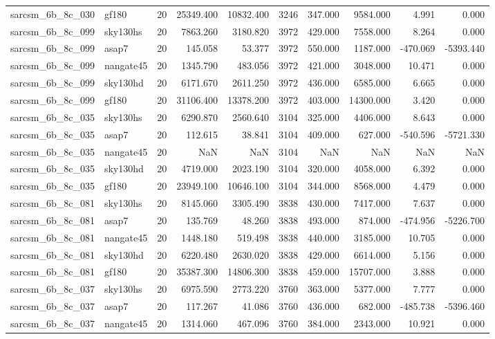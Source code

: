 \begin{longtable}{llrrrrrrrr}
sarcsm\_6b\_8c\_030 & gf180 & 20 & 25349.400 & 10832.400 & 3246 & 347.000 & 9584.000 & 4.991 & 0.000 \\
sarcsm\_6b\_8c\_099 & sky130hs & 20 & 7863.260 & 3180.820 & 3972 & 429.000 & 7558.000 & 8.264 & 0.000 \\
sarcsm\_6b\_8c\_099 & asap7 & 20 & 145.058 & 53.377 & 3972 & 550.000 & 1187.000 & -470.069 & -5393.440 \\
sarcsm\_6b\_8c\_099 & nangate45 & 20 & 1345.790 & 483.056 & 3972 & 421.000 & 3048.000 & 10.471 & 0.000 \\
sarcsm\_6b\_8c\_099 & sky130hd & 20 & 6171.670 & 2611.250 & 3972 & 436.000 & 6585.000 & 6.665 & 0.000 \\
sarcsm\_6b\_8c\_099 & gf180 & 20 & 31106.400 & 13378.200 & 3972 & 403.000 & 14300.000 & 3.420 & 0.000 \\
sarcsm\_6b\_8c\_035 & sky130hs & 20 & 6290.870 & 2560.640 & 3104 & 325.000 & 4406.000 & 8.643 & 0.000 \\
sarcsm\_6b\_8c\_035 & asap7 & 20 & 112.615 & 38.841 & 3104 & 409.000 & 627.000 & -540.596 & -5721.330 \\
sarcsm\_6b\_8c\_035 & nangate45 & 20 & NaN & NaN & 3104 & NaN & NaN & NaN & NaN \\
sarcsm\_6b\_8c\_035 & sky130hd & 20 & 4719.000 & 2023.190 & 3104 & 320.000 & 4058.000 & 6.392 & 0.000 \\
sarcsm\_6b\_8c\_035 & gf180 & 20 & 23949.100 & 10646.100 & 3104 & 344.000 & 8568.000 & 4.479 & 0.000 \\
sarcsm\_6b\_8c\_081 & sky130hs & 20 & 8145.060 & 3305.490 & 3838 & 430.000 & 7417.000 & 7.637 & 0.000 \\
sarcsm\_6b\_8c\_081 & asap7 & 20 & 135.769 & 48.260 & 3838 & 493.000 & 874.000 & -474.956 & -5226.700 \\
sarcsm\_6b\_8c\_081 & nangate45 & 20 & 1448.180 & 519.498 & 3838 & 440.000 & 3185.000 & 10.705 & 0.000 \\
sarcsm\_6b\_8c\_081 & sky130hd & 20 & 6220.480 & 2630.020 & 3838 & 429.000 & 6614.000 & 5.156 & 0.000 \\
sarcsm\_6b\_8c\_081 & gf180 & 20 & 35387.300 & 14806.300 & 3838 & 459.000 & 15707.000 & 3.888 & 0.000 \\
sarcsm\_6b\_8c\_037 & sky130hs & 20 & 6975.590 & 2773.220 & 3760 & 363.000 & 5377.000 & 7.777 & 0.000 \\
sarcsm\_6b\_8c\_037 & asap7 & 20 & 117.267 & 41.086 & 3760 & 436.000 & 682.000 & -485.738 & -5396.460 \\
sarcsm\_6b\_8c\_037 & nangate45 & 20 & 1314.060 & 467.096 & 3760 & 384.000 & 2343.000 & 10.921 & 0.000 \\

\end{longtable}
